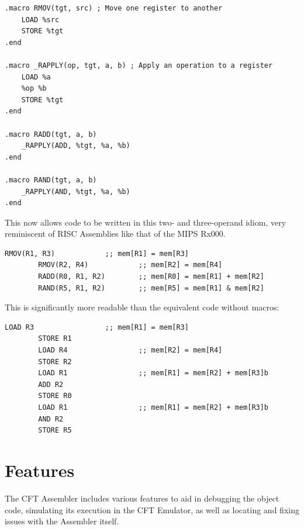 \begin{lstlisting}[language=cftasm]
.macro RMOV(tgt, src) ; Move one register to another
	LOAD %src
	STORE %tgt
.end

.macro _RAPPLY(op, tgt, a, b) ; Apply an operation to a register
	LOAD %a
	%op %b
	STORE %tgt
.end

.macro RADD(tgt, a, b)
	_RAPPLY(ADD, %tgt, %a, %b)
.end

.macro RAND(tgt, a, b)
	_RAPPLY(AND, %tgt, %a, %b)
.end
\end{lstlisting}

This now allows code to be written in this two- and three-operand idiom, very
reminiscent of RISC Assemblies like that of the MIPS Rx000.

\begin{lstlisting}[language=cftasm]
        RMOV(R1, R3)            ;; mem[R1] = mem[R3]
        RMOV(R2, R4)            ;; mem[R2] = mem[R4]
        RADD(R0, R1, R2)        ;; mem[R0] = mem[R1] + mem[R2]
        RAND(R5, R1, R2)        ;; mem[R5] = mem[R1] & mem[R2]
\end{lstlisting}

This is significantly more readable than the equivalent code without macros:

\begin{lstlisting}[language=cftasm]
        LOAD R3                 ;; mem[R1] = mem[R3]
        STORE R1
        LOAD R4                 ;; mem[R2] = mem[R4]
        STORE R2
        LOAD R1                 ;; mem[R1] = mem[R2] + mem[R3]b
        ADD R2
        STORE R0
        LOAD R1                 ;; mem[R1] = mem[R2] + mem[R3]b
        AND R2
        STORE R5
\end{lstlisting}


\section{Features}

The CFT Assembler includes various features to aid in debugging the object
code, simulating its execution in the CFT Emulator, as well as locating and
fixing issues with the Assembler itself.

















